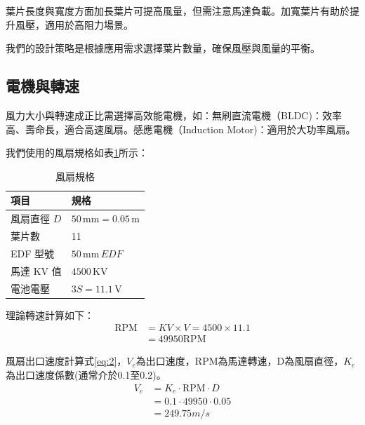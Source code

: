 \documentclass[12pt]{article}       %
\begin{document}
葉片長度與寬度方面加長葉片可提高風量，但需注意馬達負載。加寬葉片有助於提升風壓，適用於高阻力場景。

我們的設計策略是根據應用需求選擇葉片數量，確保風壓與風量的平衡。

\subsection{電機與轉速} 
\hspace{2em}風力大小與轉速成正比需選擇高效能電機，如：無刷直流電機（BLDC)：效率高、壽命長，適合高速風扇。感應電機（Induction Motor)：適用於大功率風扇。

我們使用的風扇規格如表\ref{tab:fan}所示：
    \begin{table}[H]
        \centering
        \caption{風扇規格}
        \vspace{6pt} %
        \label{tab:fan}
        \begin{tabular}{ll}
            \toprule
            \textbf{項目} & \textbf{規格} \\
            \midrule
            風扇直徑 \(D\) & \(50\,\mathrm{mm} = 0.05\,\mathrm{m}\) \\
            葉片數 & 11 \\
            EDF 型號 & \(50\,\mathrm{mm}\,EDF\) \\
            馬達 KV 值 & \(4500\,\mathrm{KV}\)\\
            電池電壓 & \(3S = 11.1\,\mathrm{V}\)\\
            \bottomrule
        \end{tabular}
    \end{table}

    理論轉速計算如下：
    \begin{align}
        \text{RPM} &= KV \times V = 4500 \times 11.1  \label{eq:1}
        \\
        &= 49950\text{RPM} \nonumber
    \end{align}

    風扇出口速度計算式\ref{eq:2}，$V_e$為出口速度，$\text{RPM}$為馬達轉速，$\text{D}$為風扇直徑，$K_e$為出口速度係數(通常介於0.1至0.2)。
    \begin{align}
        V_e &= K_e \cdot \text{RPM} \cdot D  \label{eq:2}
        \\
        &= 0.1 \cdot 49950 \cdot 0.05  \nonumber
        \\
        &= 249.75 m/s \nonumber
    \end{align}
\end{document}
